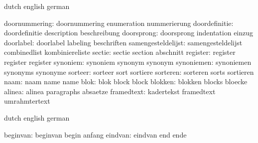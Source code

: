 
\startsetupvariables  dutch                english             german

      doornummering:  doornummering        enumeration         nummerierung
      doordefinitie:  doordefinitie        description         beschreibung
         doorsprong:  doorsprong           indentation         einzug
          doorlabel:  doorlabel            labeling            beschriften
 samengesteldelijst:  samengesteldelijst   combinedlist        kombiniereliste
             sectie:  sectie               section             abschnitt
           register:  register             register            register
           synoniem:  synoniem             synonym             synonym
         synoniemen:  synoniemen           synonyms            synonyme
            sorteer:  sorteer              sort                sortiere
           sorteren:  sorteren             sorts               sortieren
               naam:  naam                 name                name
               blok:  blok                 block               block
            blokken:  blokken              blocks              bloecke
             alinea:  alinea               paragraphs          absaetze
         framedtext:  kadertekst           framedtext          umrahmtertext

\stopsetupvariables




\startelements        dutch                english             german

           beginvan:  beginvan             begin               anfang
            eindvan:  eindvan              end                 ende

